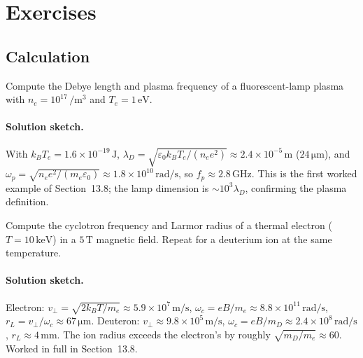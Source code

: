 \section{Exercises}

\subsection*{Calculation}

\begin{exercise}
Compute the Debye length and plasma frequency of a fluorescent-lamp
plasma with $n_{e} = 10^{17}\,\si{\per\meter\cubed}$ and $T_{e} =
1\,\si{\electronvolt}$.
\paragraph{Solution sketch.} With $k_{B}T_{e} = 1.6\times 10^{-19}\,\si{
\joule}$, $\lambda_{D} = \sqrt{\varepsilon_{0}k_{B}T_{e}/(n_{e}e^{2})}
\approx 2.4\times 10^{-5}\,\si{\meter}$ ($24\,\si{\micro\meter}$), and
$\omega_{p} = \sqrt{n_{e}e^{2}/(m_{e}\varepsilon_{0})} \approx 1.8\times
10^{10}\,\si{\radian\per\second}$, so $f_{p}\approx 2.8\,\si{\giga\hertz}$.
This is the first worked example of Section~13.8; the lamp dimension is
$\sim 10^{3}\lambda_{D}$, confirming the plasma definition.
\end{exercise}

\begin{exercise}
Compute the cyclotron frequency and Larmor radius of a thermal
electron ($T = 10\,\si{\kilo\electronvolt}$) in a $5\,\si{\tesla}$
magnetic field. Repeat for a deuterium ion at the same temperature.
\paragraph{Solution sketch.} Electron: $v_{\perp} = \sqrt{2k_{B}T/m_{e}}
\approx 5.9\times 10^{7}\,\si{\meter\per\second}$, $\omega_{c} = eB/m_{e}
\approx 8.8\times 10^{11}\,\si{\radian\per\second}$, $r_{L} =
v_{\perp}/\omega_{c} \approx 67\,\si{\micro\meter}$. Deuteron: $v_{\perp}
\approx 9.8\times 10^{5}\,\si{\meter\per\second}$, $\omega_{c} = eB/m_{D}
\approx 2.4\times 10^{8}\,\si{\radian\per\second}$, $r_{L}\approx
4\,\si{\milli\meter}$. The ion radius exceeds the electron's by roughly
$\sqrt{m_{D}/m_{e}}\approx 60$. Worked in full in Section~13.8.
\end{exercise}

